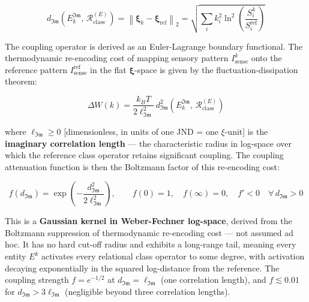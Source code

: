 \documentclass[11pt,a4paper]{article}
\theoremstyle{definition}
\theoremstyle{remark}
\begin{document}
\begin{equation}
d_{\mathfrak{Im}}\!\left(E_k^{\mathfrak{Im}},\, \mathcal{R}_{\text{class}}^{(E)}\right) = \left\| \boldsymbol{\xi}_k - \boldsymbol{\xi}_{\text{ref}} \right\|_2 = \sqrt{\sum_i k_i^2 \ln^2\!\left(\frac{S_i^k}{S_i^{\text{ref}}}\right)}
\end{equation}


The coupling operator is derived as an Euler-Lagrange boundary functional. The thermodynamic re-encoding cost of mapping sensory pattern $I_{\text{sense}}^k$ onto the reference pattern $I_{\text{sense}}^{\text{ref}}$ in the flat $\boldsymbol{\xi}$-space is given by the fluctuation-dissipation theorem:


\begin{equation}
\Delta W(k) = \frac{k_B T}{2\ell_{\mathfrak{Im}}^2}\, d_{\mathfrak{Im}}^2\!\left(E_k^{\mathfrak{Im}},\, \mathcal{R}_{\text{class}}^{(E)}\right)
\end{equation}


where $\ell_{\mathfrak{Im}} \geq 0$ [dimensionless, in units of one JND = one $\xi$-unit] is the \textbf{imaginary correlation length} — the characteristic radius in log-space over which the reference class operator retains significant coupling. The coupling attenuation function is then the Boltzmann factor of this re-encoding cost:


\begin{equation}
\boxed{f(d_{\mathfrak{Im}}) = \exp\!\left(-\frac{d_{\mathfrak{Im}}^2}{2\ell_{\mathfrak{Im}}^2}\right), \qquad f(0) = 1, \quad f(\infty) = 0, \quad f' < 0 \quad \forall\, d_{\mathfrak{Im}} > 0}
\end{equation}


This is a \textbf{Gaussian kernel in Weber-Fechner log-space}, derived from the Boltzmann suppression of thermodynamic re-encoding cost — not assumed ad hoc. It has no hard cut-off radius and exhibits a long-range tail, meaning every entity $E^k$ activates every relational class operator to some degree, with activation decaying exponentially in the squared log-distance from the reference. The coupling strength $f = e^{-1/2}$ at $d_{\mathfrak{Im}} = \ell_{\mathfrak{Im}}$ (one correlation length), and $f \lesssim 0.01$ for $d_{\mathfrak{Im}} > 3\ell_{\mathfrak{Im}}$ (negligible beyond three correlation lengths).
\end{document}
